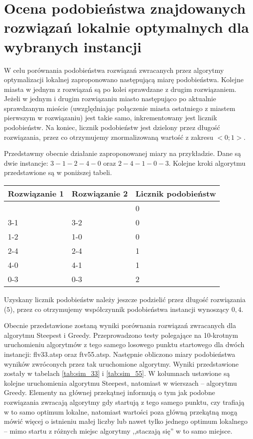 \section{Ocena podobieństwa znajdowanych rozwiązań lokalnie optymalnych dla wybranych instancji}
W celu porównania podobieństwa rozwiązań zwracanych przez algorytmy optymalizacji lokalnej zaproponowano następującą miarę podobieństwa. Kolejne miasta w jednym z rozwiązań są po kolei sprawdzane z drugim rozwiązaniem. Jeżeli w jednym i drugim rozwiązaniu miasto następująco po aktualnie sprawdzanym mieście (uwzględniając połączenie miasta ostatniego z miastem pierwszym w rozwiązaniu) jest takie samo, inkrementowany jest licznik podobieństw. Na koniec, licznik podobieństw jest dzielony przez długość rozwiązania, przez co otrzymujemy znormalizowaną wartość z zakresu $<0;1>$.

Przedstawmy obecnie działanie zaproponowanej miary na przykładzie. Dane są dwie instancje: $3-1-2-4-0$ oraz $2-4-1-0-3$. Kolejne kroki algorytmu przedstawione są w poniższej tabeli.

\begin{tabular}{|l|l|l|}
		\hline
		Rozwiązanie 1 & Rozwiązanie 2 & Licznik podobieństw\\
		\hline
		& & 0 \\
		3-1 & 3-2 & 0 \\
		1-2 & 1-0 & 0 \\
		2-4 & 2-4 & 1 \\
		4-0 & 4-1 & 1 \\
		0-3 & 0-3 & 2\\
		\hline
\end{tabular}

\noindent Uzyskany licznik podobieństw należy jeszcze podzielić przez długość rozwiązania ($5$), przez co otrzymujemy współczynnik podobieństwa instancji wynoszący $0,4$.

Obecnie przedstawione zostaną wyniki porównania rozwiązań zwracanych dla algorytmu Steepest i Greedy. Przeprowadzono testy polegające na 10-krotnym uruchomieniu algorytmów z tego samego losowego punktu startowego dla dwóch instancji: flv33.atsp oraz ftv55.atsp. Następnie obliczono miary podobieństwa wyników zwróconych przez tak uruchomione algorytmy. Wyniki przedstawione zostały w tabelach \ref{tab:sim_33} i \ref{tab:sim_55}. W kolumnach ustawione są kolejne uruchomienia algorytmu Steepest, natomiast w wierszach -- algorytmu Greedy. Elementy na głównej przekątnej informują o tym jak podobne rozwiązania zwracają algorytmy gdy startują z tego samego punktu, czy trafiają w to samo optimum lokalne, natomiast wartości poza główną przekątną mogą mówić więcej o istnieniu małej liczby lub nawet tylko jednego optimum lokalnego -- mimo startu z różnych miejsc algorytmy ,,staczają się'' w to samo miejsce.

